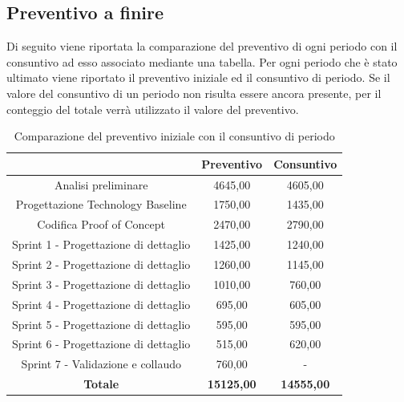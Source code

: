 \subsection{Preventivo a finire} \label{subsection:preventivo_a_finire}
Di seguito viene riportata la comparazione del preventivo di ogni periodo con il consuntivo ad esso associato mediante una tabella.
Per ogni periodo che è stato ultimato viene riportato il preventivo iniziale ed il consuntivo di periodo.
Se il valore del consuntivo di un periodo non risulta essere ancora presente, per il conteggio del totale verrà utilizzato il valore del preventivo.
\begin{table}[H]
  \centering
  \renewcommand{\arraystretch}{1.8}
  \begin{tabular}{c|c|c}
    \rowcolor[HTML]{125E28}
    \multicolumn{1}{c}{\color[HTML]{FFFFFF}\textbf{Periodo}}
                                          & \multicolumn{1}{c}{\color[HTML]{FFFFFF}\textbf{Preventivo}}
                                          & \multicolumn{1}{c}{\color[HTML]{FFFFFF}\textbf{Consuntivo}}                     \\
    \hline
    Analisi preliminare                   & 4645,00                                                     & 4605,00           \\
    Progettazione Technology Baseline     & 1750,00                                                     & 1435,00           \\
    Codifica Proof of Concept             & 2470,00                                                     & 2790,00           \\
    Sprint 1 - Progettazione di dettaglio & 1425,00                                                     & 1240,00           \\
    Sprint 2 - Progettazione di dettaglio & 1260,00                                                     & 1145,00           \\
    Sprint 3 - Progettazione di dettaglio & 1010,00                                                     & 760,00            \\
    Sprint 4 - Progettazione di dettaglio & 695,00                                                      & 605,00            \\
    Sprint 5 - Progettazione di dettaglio & 595,00                                                      & 595,00            \\
    Sprint 6 - Progettazione di dettaglio & 515,00                                                      & 620,00            \\
    Sprint 7 - Validazione e collaudo     & 760,00                                                      & -                 \\
    \textbf{Totale}                       & \textbf{15125,00}                                           & \textbf{14555,00} \\
  \end{tabular}
  \caption{Comparazione del preventivo iniziale con il consuntivo di periodo}
\end{table}

